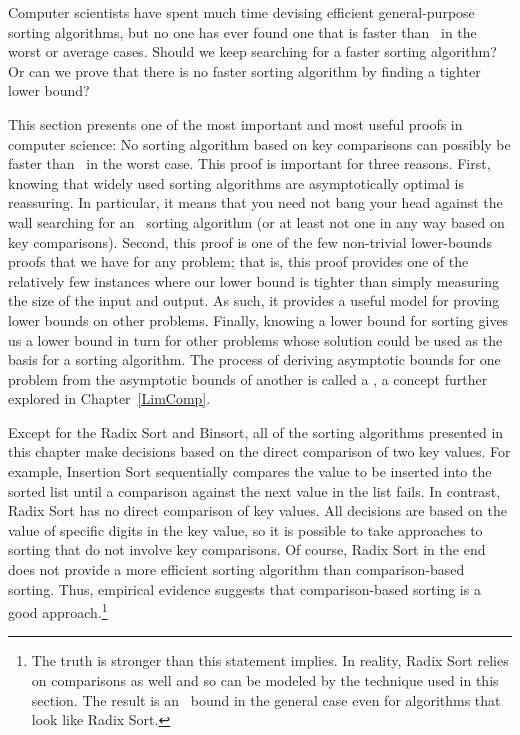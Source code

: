 Computer scientists have spent much time devising efficient
general-purpose sorting algorithms, but no one has ever found one
that is faster than \Onlogn\ in the worst or average cases.
Should we keep searching for a faster sorting algorithm?
Or can we prove that there is no faster sorting algorithm by finding
a tighter lower bound?

This section presents one of the most important and most useful
proofs in computer science:
No sorting algorithm based on key comparisons can possibly be
faster than \Omeganlogn\ in the worst case.
This proof is important for three reasons.
First, knowing that widely used sorting algorithms are asymptotically
optimal is reassuring.
In particular, it means that you need not bang your head against
the wall searching for an \On\ sorting algorithm (or at least
not one in any way based on key comparisons).
Second, this proof is one of the few non-trivial lower-bounds proofs
that we have for any problem; that is, this proof provides one of the
relatively few instances where our lower bound is tighter than simply
measuring the size of the input and output.
As such, it provides a useful model for proving lower bounds on other
problems.
Finally, knowing a lower bound for sorting gives us a lower
bound in turn for other problems whose solution could be used as the
basis for a sorting algorithm.
The process of deriving asymptotic bounds for one problem from the
asymptotic bounds of another is called a
,
a concept further explored in Chapter~\ref{LimComp}.

Except for the Radix Sort and
Binsort, all of the sorting algorithms
presented in this chapter make decisions based on the direct
comparison of two key values.
For example, Insertion Sort
sequentially compares the value to be inserted into the sorted list
until a comparison against the next value in the list fails.
In contrast, Radix Sort has no direct comparison of key values.
All decisions are based on the value of specific digits in the key
value,
so it is possible to take approaches to sorting that do not involve
key comparisons.
Of course, Radix Sort in the end does not provide a more efficient
sorting algorithm than comparison-based sorting.
Thus, empirical evidence suggests that comparison-based sorting is a
good approach.\footnote{The truth is stronger than this statement
implies.
In reality, Radix Sort relies on comparisons as well and so can be
modeled by the technique used in this section.
The result is an \Omeganlogn\ bound in the general case even for
algorithms that look like Radix Sort.}

